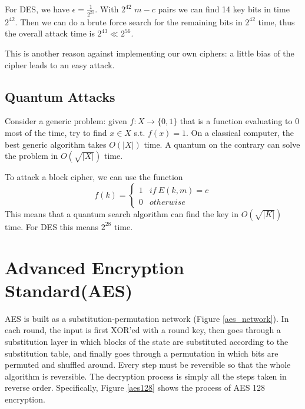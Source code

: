 For DES, we have $\epsilon=\frac{1}{2^{21}}$. With $2^{42}$ $m-c$ pairs we can find 14 key bits in time $2^{42}$. Then we can do a brute force search for the remaining bits in $2^{42}$ time, thus the overall attack time is $2^{43}\ll 2^{56}$. 

This is another reason against implementing our own ciphers: a little bias of the cipher leads to an easy attack.
\subsection{Quantum Attacks}
Consider a generic problem: given $f:X\rightarrow\{0,1\}$ that is a function evaluating to 0 most of the time, try to find $x\in X$ s.t. $f(x)=1$. On a classical computer, the best generic algorithm takes $O(\lvert X\rvert)$ time. A quantum on the contrary can solve the problem in $O(\sqrt{\lvert X\rvert})$ time.

To attack a block cipher, we can use the function
\begin{equation*}
f(k)=\begin{cases}
1&if\:E(k,m)=c\\
0&otherwise
\end{cases}\end{equation*}
This means that a quantum search algorithm can find the key in $O(\sqrt{\lvert K\rvert})$ time. For DES this means $2^{28}$ time. 

\section{Advanced Encryption Standard(AES)}
AES is built as a substitution-permutation network (Figure \ref{aes_network}). In each round, the input is first XOR'ed with a round key, then goes through a substitution layer in which blocks of the state are substituted according to the substitution table, and finally goes through a permutation in which bits are permuted and shuffled around. Every step must be reversible so that the whole algorithm is reversible. The decryption process is simply all the steps taken in reverse order. Specifically, Figure \ref{aes128} shows the process of AES 128 encryption.

